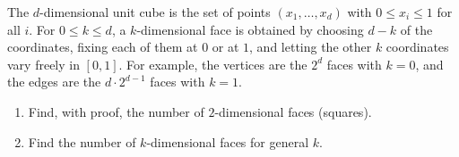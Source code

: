 The $d$-dimensional unit cube is the set of points $\left(x_1,\dots,x_d\right)$ with $0\le x_i\le1$ for all $i$. For $0\le k\le d$, a $k$-dimensional face is obtained by choosing $d-k$ of the coordinates, fixing each of them at $0$ or at $1$, and letting the other $k$ coordinates vary freely in $[0,1]$. For example, the vertices are the $2^d$ faces with $k=0$, and the edges are the $d\cdot2^{d-1}$ faces with $k=1$.
\begin{enumerate}
\item[(a)] Find, with proof, the number of $2$-dimensional faces (squares).
\item[(b)] Find the number of $k$-dimensional faces for general $k$.
\end{enumerate}
